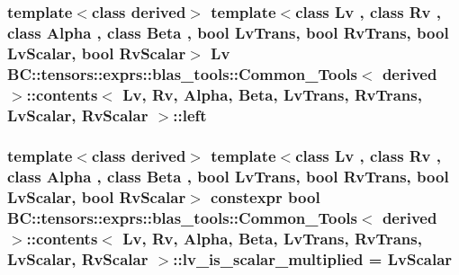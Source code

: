 \subsubsection[{\texorpdfstring{left}{left}}]{\setlength{\rightskip}{0pt plus 5cm}template$<$class derived$>$ template$<$class Lv , class Rv , class Alpha , class Beta , bool Lv\+Trans, bool Rv\+Trans, bool Lv\+Scalar, bool Rv\+Scalar$>$ Lv {\bf B\+C\+::tensors\+::exprs\+::blas\+\_\+tools\+::\+Common\+\_\+\+Tools}$<$ derived $>$\+::{\bf contents}$<$ Lv, Rv, Alpha, Beta, Lv\+Trans, Rv\+Trans, Lv\+Scalar, Rv\+Scalar $>$\+::left}\hypertarget{structBC_1_1tensors_1_1exprs_1_1blas__tools_1_1Common__Tools_1_1contents_ae538d6e891495d3f3f06e1390991a745}{}\label{structBC_1_1tensors_1_1exprs_1_1blas__tools_1_1Common__Tools_1_1contents_ae538d6e891495d3f3f06e1390991a745}
\subsubsection[{\texorpdfstring{lv\+\_\+is\+\_\+scalar\+\_\+multiplied}{lv_is_scalar_multiplied}}]{\setlength{\rightskip}{0pt plus 5cm}template$<$class derived$>$ template$<$class Lv , class Rv , class Alpha , class Beta , bool Lv\+Trans, bool Rv\+Trans, bool Lv\+Scalar, bool Rv\+Scalar$>$ constexpr bool {\bf B\+C\+::tensors\+::exprs\+::blas\+\_\+tools\+::\+Common\+\_\+\+Tools}$<$ derived $>$\+::{\bf contents}$<$ Lv, Rv, Alpha, Beta, Lv\+Trans, Rv\+Trans, Lv\+Scalar, Rv\+Scalar $>$\+::lv\+\_\+is\+\_\+scalar\+\_\+multiplied = Lv\+Scalar\hspace{0.3cm}{\ttfamily [static]}}\hypertarget{structBC_1_1tensors_1_1exprs_1_1blas__tools_1_1Common__Tools_1_1contents_a2c959dc5dbb504b158698a43077b8d17}{}\label{structBC_1_1tensors_1_1exprs_1_1blas__tools_1_1Common__Tools_1_1contents_a2c959dc5dbb504b158698a43077b8d17}
